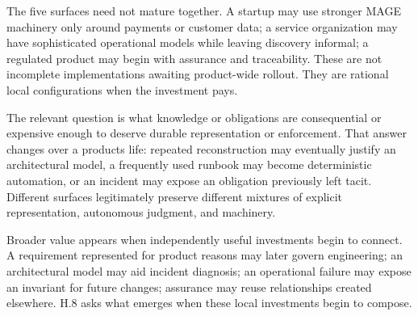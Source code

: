 

The five surfaces need not mature together. A startup may use stronger MAGE machinery only around payments or customer data; a service organization may have sophisticated operational models while leaving discovery informal; a regulated product may begin with assurance and traceability. These are not incomplete implementations awaiting product-wide rollout. They are rational local configurations when the investment pays.

The relevant question is what knowledge or obligations are consequential or expensive enough to deserve durable representation or enforcement. That answer changes over a product\textquotesingle s life: repeated reconstruction may eventually justify an architectural model, a frequently used runbook may become deterministic automation, or an incident may expose an obligation previously left tacit. Different surfaces legitimately preserve different mixtures of explicit representation, autonomous judgment, and machinery.

Broader value appears when independently useful investments begin to connect. A requirement represented for product reasons may later govern engineering; an architectural model may aid incident diagnosis; an operational failure may expose an invariant for future changes; assurance may reuse relationships created elsewhere. H.8 asks what emerges when these local investments begin to compose.
